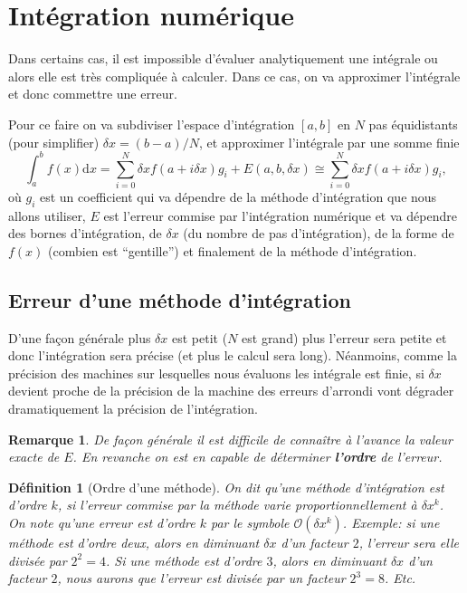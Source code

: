 \documentclass[a4paper,12pt]{book}
\newcommand{\dd}{\mathrm{d}}
\newtheorem{definition}{Définition}
\newtheorem*{remarque}{Remarque}
\begin{document}
\section{Intégration numérique}

Dans certains cas, il est impossible d'évaluer analytiquement une intégrale ou alors elle est très compliquée à calculer.
Dans ce cas, on va approximer l'intégrale et donc commettre une erreur.

Pour ce faire on va subdiviser l'espace d'intégration $[a,b]$ en $N$ pas équidistants (pour simplifier) $\delta x=(b-a)/N$,
et approximer l'intégrale par une somme finie
\begin{equation}
 \int_a^bf(x)\dd x=\sum_{i=0}^{N} \delta x f(a+i\delta x) g_i+E(a,b,\delta x)\cong\sum_{i=0}^{N} \delta x f(a+i\delta x) g_i,
\end{equation}
où $g_i$ est un coefficient qui va dépendre de la méthode d'intégration 
que nous allons utiliser, $E$ est l'erreur commise par l'intégration numérique et va dépendre des bornes d'intégration, 
de $\delta x$ (du nombre de pas d'intégration), de la forme de $f(x)$ (combien est ``gentille'') et finalement de
la méthode d'intégration.

\subsection{Erreur d'une méthode d'intégration}

D'une façon générale plus $\delta x$ est petit ($N$ est grand) plus l'erreur sera petite et donc l'intégration sera précise
(et plus le calcul sera long).
Néanmoins, comme la précision des machines sur lesquelles nous évaluons les intégrale est finie, si $\delta x$ devient 
proche de la précision de la machine des erreurs d'arrondi vont dégrader dramatiquement la précision de l'intégration.

\begin{remarque}
De façon générale il est difficile de connaître à l'avance la valeur exacte de $E$. En revanche on est
en capable de déterminer \textbf{l'ordre} de l'erreur.
\end{remarque}

\begin{definition}[Ordre d'une méthode]
 On dit qu'une méthode d'intégration est d'ordre $k$, si l'erreur commise par la méthode varie 
 proportionnellement à $\delta x^k$. On note qu'une erreur est d'ordre $k$ par le symbole $\mathcal{O}(\delta x^k)$. Exemple: si une méthode est d'ordre deux, alors en diminuant 
 $\delta x$ d'un facteur $2$, l'erreur sera elle divisée par $2^2=4$. Si une méthode est d'ordre $3$, alors en diminuant 
 $\delta x$ d'un facteur $2$, nous aurons que l'erreur est divisée par un facteur $2^3=8$. Etc.
\end{definition}
\end{document}
